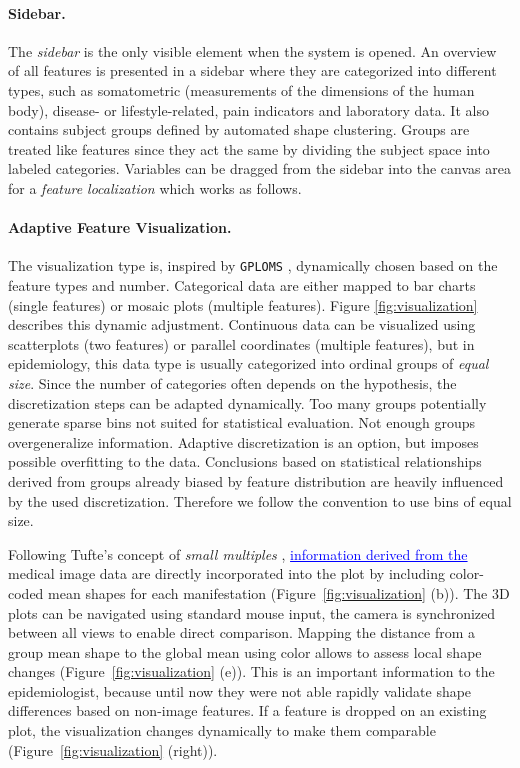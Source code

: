 \documentclass[journal]{style/vgtc} 			          %
\newcommand{\add}[1]{\textcolor{blue}{\uline{#1}}}
\begin{document}
\paragraph{Sidebar.}
The \emph{sidebar} is the only visible element when the system is opened.
%
An overview of all features is presented in a sidebar where they are categorized into different types, such as somatometric (measurements of the dimensions of the human body), disease- or lifestyle-related, pain indicators and laboratory data.
%
It also contains subject groups defined by automated shape clustering.
%
Groups are treated like features since they act the same by dividing the subject space into labeled categories.
%
Variables can be dragged from the sidebar into the canvas area for a \emph{feature localization} which works as follows.
%

\paragraph{Adaptive Feature Visualization.} \label{sec:AdaptiveFeatureVisualization}
The visualization type is, inspired by \texttt{GPLOMS} \cite{Francois2013}, dynamically chosen based on the feature types and number.
%
Categorical data are either mapped to bar charts (single features) or mosaic plots (multiple features).
%
Figure \ref{fig:visualization} describes this dynamic adjustment.
%
Continuous data can be visualized using scatterplots (two features) or parallel coordinates (multiple features), but in epidemiology, this data type is usually categorized into ordinal groups of \emph{equal size}.
%
Since the number of categories often depends on the hypothesis, the discretization steps can be adapted dynamically.
%
Too many groups potentially generate sparse bins not suited for statistical evaluation.
%
Not enough groups overgeneralize information.
%
Adaptive discretization is an option, but imposes possible overfitting to the data.
%
Conclusions based on statistical relationships derived from groups already biased by feature distribution are heavily influenced by the used discretization.
%
Therefore we follow the convention to use bins of equal size.

%
%
Following Tufte's concept of \emph{small multiples} \cite{Tufte1983}, \add{information derived from the} medical image data are directly incorporated into the plot by including color-coded mean shapes for each manifestation (Figure~\ref{fig:visualization} (b)).
%
The 3D plots can be navigated using standard mouse input, the camera is synchronized between all views to enable direct comparison.
%
Mapping the distance from a group mean shape to the global mean using color allows to assess local shape changes (Figure~\ref{fig:visualization} (e)).
%
This is an important information to the epidemiologist, because until now they were not able rapidly validate shape differences based on non-image features.
%
If a feature is dropped on an existing plot, the visualization changes dynamically to make them comparable (Figure~\ref{fig:visualization} (right)).
\end{document}

